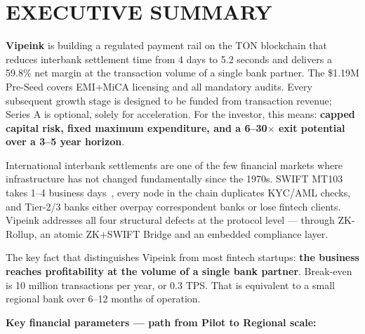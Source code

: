 \documentclass[11pt,a4paper]{article}
\begin{document}
\section{EXECUTIVE SUMMARY}

\begin{tcolorbox}[insightbox, title={Investment Thesis in One Paragraph}]
\textbf{Vipeink} is building a regulated payment rail on the TON blockchain that reduces interbank settlement time from 4 days to 5.2 seconds and delivers a 59.8\% net margin at the transaction volume of a single bank partner. The \$1.19M Pre-Seed covers EMI+MiCA licensing and all mandatory audits. Every subsequent growth stage is designed to be funded from transaction revenue; Series A is optional, solely for acceleration. For the investor, this means: \textbf{capped capital risk, fixed maximum expenditure, and a 6--30$\times$ exit potential over a 3--5 year horizon}.
\end{tcolorbox}

\vspace{0.3em}

International interbank settlements are one of the few financial markets where infrastructure has not changed fundamentally since the 1970s. SWIFT MT103 takes 1--4 business days~\cite{swift_mt103}, every node in the chain duplicates KYC/AML checks, and Tier-2/3 banks either overpay correspondent banks or lose fintech clients. Vipeink addresses all four structural defects at the protocol level --- through ZK-Rollup, an atomic ZK+SWIFT Bridge and an embedded compliance layer.

The key fact that distinguishes Vipeink from most fintech startups: \textbf{the business reaches profitability at the volume of a single bank partner}. Break-even is 10 million transactions per year, or 0.3 TPS. That is equivalent to a small regional bank over 6--12 months of operation.

\vspace{0.3em}
\noindent\textbf{Key financial parameters --- path from Pilot to Regional scale:}
\end{document}
